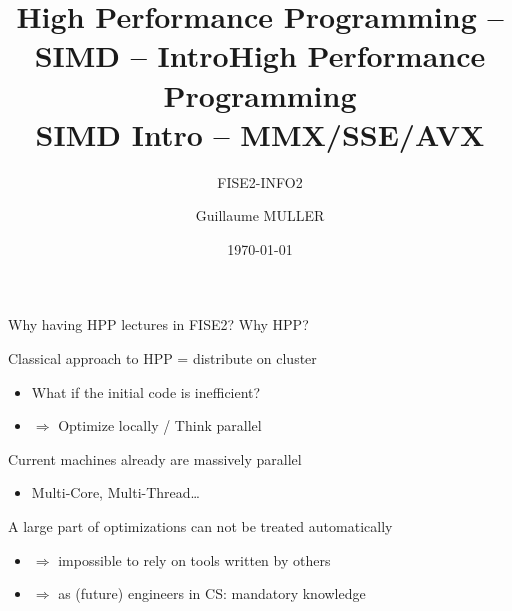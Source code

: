 \documentclass[presentation]{beamer}
\author{Guillaume MULLER}
\date{\today}
\title{High Performance Programming -- SIMD -- Intro}
\title[HPP -- SIMD -- Intro]{High Performance Programming\\SIMD Intro -- MMX/SSE/AVX}
\subtitle{FISE2-INFO2}
\begin{document}
\maketitle

\section*{}
\label{sec:orgb241b26}

\begin{frame}[label={sec:orgdd476bd}]{Why having HPP lectures in FISE2? Why HPP?}
\pause
\begin{block}{Classical approach to HPP = distribute on cluster}
\begin{itemize}
\item What if the initial code is inefficient?
\item \(\Rightarrow\) Optimize locally / Think parallel
\end{itemize}
\pause
\end{block}
\begin{block}{Current machines already are massively parallel}
\begin{itemize}
\item Multi-Core, Multi-Thread\ldots{}
\end{itemize}
\pause
\end{block}
\begin{block}{A large part of optimizations can not be treated automatically}
\begin{itemize}
\item \(\Rightarrow\) impossible to rely on tools written by others
\item \(\Rightarrow\) as (future) engineers in CS: mandatory knowledge
\end{itemize}
\end{block}
\end{frame}
\end{document}
